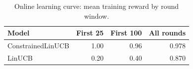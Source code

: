 \begin{table}[h]
\centering
\caption{Online learning curve: mean training reward by round window.}
\label{tab:learning-curve}
\begin{tabular}{lrrr}
\toprule
Model & First 25 & First 100 & All rounds \\
\midrule
ConstrainedLinUCB & 1.00 & 0.96 & 0.978 \\
LinUCB            & 0.20 & 0.40 & 0.870 \\
\bottomrule
\end{tabular}
\end{table}
